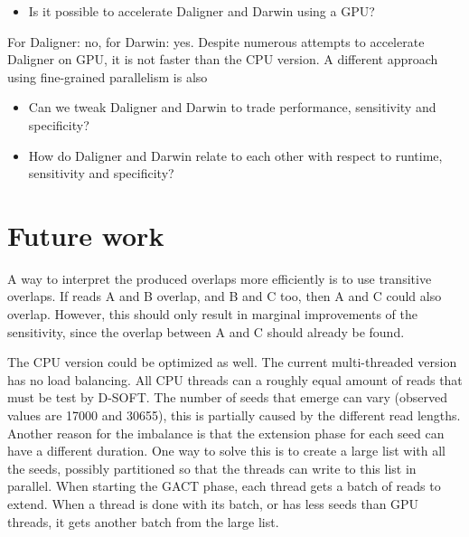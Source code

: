 \documentclass[../thesis.tex]{subfiles}
\begin{document}
\begin{itemize}
\item Is it possible to accelerate Daligner and Darwin using a GPU?
\end{itemize}
For Daligner: no, for Darwin: yes.
Despite numerous attempts to accelerate Daligner on GPU, it is not faster than the CPU version.
A different approach using fine-grained parallelism is also 

\begin{itemize}
\item Can we tweak Daligner and Darwin to trade performance, sensitivity and specificity?
\end{itemize}


\begin{itemize}
\item How do Daligner and Darwin relate to each other with respect to runtime, sensitivity and specificity?
\end{itemize}

\section{Future work}





A way to interpret the produced overlaps more efficiently is to use transitive overlaps.
If reads A and B overlap, and B and C too, then A and C could also overlap.
However, this should only result in marginal improvements of the sensitivity, since the overlap between A and C should already be found.



The CPU version could be optimized as well.
The current multi-threaded version has no load balancing.
All CPU threads can a roughly equal amount of reads that must be test by D-SOFT.
The number of seeds that emerge can vary (observed values are 17000 and 30655), this is partially caused by the different read lengths.
Another reason for the imbalance is that the extension phase for each seed can have a different duration.
One way to solve this is to create a large list with all the seeds, possibly partitioned so that the threads can write to this list in parallel.
When starting the GACT phase, each thread gets a batch of reads to extend.
When a thread is done with its batch, or has less seeds than GPU threads, it gets another batch from the large list.
\end{document}
